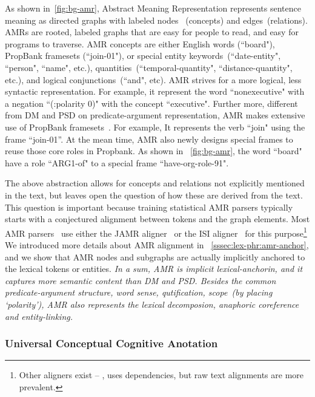 As shown in~\autoref{fig:bg-amr}, Abstract Meaning Representation
represents sentence meaning as directed graphs with labeled nodes
~(concepts) and edges~(relations). AMRs are rooted, labeled graphs
that are easy for people to read, and easy for programs to traverse.
AMR concepts are either English words (``board"), PropBank framesets
(``join-01"), or special entity keywords~(``date-entity", ``person",
``name", etc.), quantities~(``temporal-quantity",
``distance-quantity", etc.), and logical conjunctions~(``and", etc).
AMR strives for a more logical, less syntactic representation.  For
example, it represent the word ``nonexecutive" with a negation
``(:polarity 0)" with the concept ``executive". Further more,
different from DM and PSD on predicate-argument representation, AMR
makes extensive use of PropBank framesets~\citep{Kin:Pal:02,
  palmer2005proposition}. For example, It represents the verb ``join"
using the frame “join-01”. At the mean time, AMR also newly designs
special frames to reuse those core roles in Propbank. As shown in
~\autoref{fig:bg-amr}, the word ``board" have a role ``ARG1-of" to a
special frame ``have-org-role-91".

The above abstraction allows for concepts and relations not explicitly
mentioned in the text, but leaves open the question of how these are
derived from the text. This question is important because training
statistical AMR parsers typically starts with a conjectured alignment
between tokens and the graph elements. Most AMR
parsers~\cite[\eg][]{Flanigan:2014vc,Wang:2015uo,Artzi:2009tb,Pust:2015ug,Peng:2015tj,Konstas:2017uj,Wang:2017vt}
use either the JAMR aligner~\cite{Flanigan:2014vc} or the ISI
aligner~\cite{Pourdamghani:2014aligning} for this
purpose\footnote{Other aligners exist -- \eg,
  \citet{chen2017unsupervised} uses dependencies, but raw text
  alignments are more prevalent.}  We introduced more details about
AMR alignment in ~\autoref{sssec:lex-phr:amr-anchor}, and we show that
AMR nodes and subgraphs are actually implicitly anchored to the
lexical tokens or entities. \textit{In a sum, AMR is implicit
  lexical-anchorin, and it captures more semantic content than DM and
  PSD. Besides the common predicate-argument structure, word sense,
  qutification, scope~(by placing `polarity'), AMR also represents the
  lexical decomposion, anaphoric coreference and entity-linking.}


\subsubsection{Universal Conceptual Cognitive Anotation}
\label{ssec:bg:ucca}

